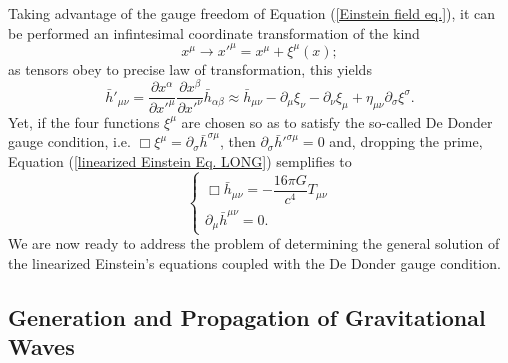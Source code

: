 Taking advantage of the gauge freedom of Equation (\ref{Einstein field eq.}), it can be performed an infintesimal coordinate transformation of the kind
\begin{equation}
    x^\mu \rightarrow{}x'^\mu=x^\mu+\xi^\mu(x);
\end{equation}
as tensors obey to precise law of transformation, this yields
\begin{equation}
    \bar{h}'_{\mu\nu}=\frac{\partial x^\alpha}{\partial x'^\mu}\frac{\partial x^\beta}{\partial x'^\nu}\bar{h}_{\alpha\beta}\approx \bar{h}_{\mu\nu}-\partial _\mu \xi_\nu -\partial_\nu \xi_\mu+\eta_{\mu\nu}\partial_\sigma\xi^\sigma.
\end{equation}
Yet, if the four functions $\xi^\mu$ are chosen so as to satisfy the so-called De Donder gauge condition, i.e. $\Box\xi^\mu=\partial_\sigma\bar{h}^{\sigma\mu}$, then $\partial_\sigma\bar{h}'^{\sigma\mu}=0$ and, dropping the prime, Equation (\ref{linearized Einstein Eq. LONG}) semplifies to
\begin{equation}\label{linearized Einstein eq + gauge condition}
\begin{cases}
\Box \bar{h}_{\mu\nu} = -\dfrac{16\pi G}{c^4} T_{\mu\nu} \\
\partial_\mu\bar{h}^{\mu\nu}=0.
\end{cases}
\end{equation}
We are now ready to address the problem of determining  the general solution of the linearized Einstein's equations coupled with the De Donder gauge condition. 


\subsection{Generation and Propagation of Gravitational Waves}

